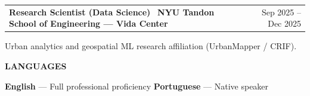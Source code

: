 \documentclass[10pt,a4paper]{article}
\makeatletter
\renewcommand{\section}[1]{%
  \par\vspace{10pt}%
  {\large\bfseries\color{accent}\MakeUppercase{#1}}\par%
  \vspace{2pt}%
  \noindent{\color{rule}\rule{\linewidth}{0.6pt}}\par%
  \vspace{2pt}%
}
\newcommand{\job}[3]{%
  \par\vspace{4pt}%
  \noindent\begin{tabularx}{\linewidth}{@{}X r@{}}%
    \textbf{#1} \, {\color{accent}\textbf{#2}} & {\small\color{muted}#3} \\
  \end{tabularx}%
  \vspace{1pt}%
}
\makeatother
\begin{document}
\job{Research Scientist (Data Science)}{NYU Tandon School of Engineering --- Vida Center}{Sep 2025 -- Dec 2025}
Urban analytics and geospatial ML research affiliation (UrbanMapper / CRIF).

\section{Languages}

\noindent\textbf{English} --- Full professional proficiency \quad\textbar\quad
\textbf{Portuguese} --- Native speaker
\end{document}
